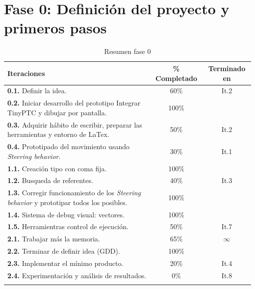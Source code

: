 \section{Fase 0: Definición del proyecto y primeros pasos}
\begin{longtable}[c]{|p{7cm}|c|c|}
\hline
Iteraciones                                               & \% Completado    & Terminado en \\
\hline
\endhead
\textbf{0.1.} Definir la idea.                              & 60\%          & It.2         \\
	\cmidrule[.006pt]{1-3}
\textbf{0.2.} Iniciar desarrollo del prototipo
				Integrar TinyPTC y dibujar por pantalla.    & 100\%         &              \\
	\cmidrule[.006pt]{1-3}
\textbf{0.3.} Adquirir hábito de escribir, preparar
				las herramientas y entorno de LaTex.        & 50\%          & It.2         \\
	\cmidrule[.006pt]{1-3}
\textbf{0.4.} Prototipado del movimiento usando 
				\textit{Steering behavior}.                 & 30\%          & It.1         \\

\cmidrule[1pt]{1-3}

\textbf{1.1.} Creación tipo con coma fija.                  & 100\%         &         \\
	\cmidrule[.006pt]{1-3}
\textbf{1.2.} Busqueda de referentes.                       & 40\%          & It.3    \\
	\cmidrule[.006pt]{1-3}
\textbf{1.3.} Corregir funcionamiento de los
				\textit{Steering behavior} y
				prototipar todos los posibles.              & 100\%         &          \\
	\cmidrule[.006pt]{1-3}
\textbf{1.4.} Sistema de debug visual: vectores.            & 100\%         &          \\ 
	\cmidrule[.006pt]{1-3}
\textbf{1.5.} Herramientras control de ejecución.           & 50\%          & It.7     \\ 

\cmidrule[1pt]{1-3}

\textbf{2.1.} Trabajar más la memoria.                      & 65\%          & $\infty$ \\
	\cmidrule[.006pt]{1-3}
\textbf{2.2.} Terminar de definir idea (GDD).               & 100\%         &          \\
	\cmidrule[.006pt]{1-3}
\textbf{2.3.} Implementar el mínimo producto.               & 20\%          & It.4     \\
	\cmidrule[.006pt]{1-3}
\textbf{2.4.} Experimentación y análisis de resultados.     & 0\%           & It.8     \\
\hline
\caption{Resumen fase 0}
\end{longtable}

